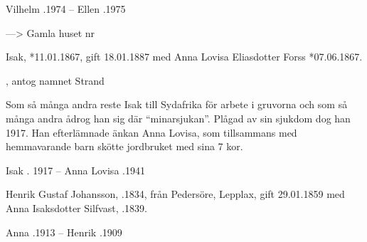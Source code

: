 Vilhelm .1974  --  Ellen .1975



---> Gamla huset nr 


Isak, *11.01.1867, gift 18.01.1887 med Anna Lovisa Eliasdotter Forss *07.06.1867.
\begin{jhchildren}
  \item {}
  \item {}, antog namnet Strand
  \item {}
  \item {}
  \item {}
  \item {}
  \item {}
  \item {}
  \item {}
\end{jhchildren}

Som så många andra reste Isak till Sydafrika för arbete i gruvorna och som så många andra ådrog han sig där ``minarsjukan''. Plågad av sin sjukdom dog han 1917. Han efterlämnade änkan Anna Lovisa, som tillsammans med hemmavarande barn skötte jordbruket med sina 7 kor.

Isak . 1917  --  Anna Lovisa .1941


Henrik Gustaf Johansson, .1834, från Pedersöre, Lepplax, gift 29.01.1859 med Anna Isaksdotter Silfvast, .1839.
\begin{jhchildren}
  \item {}
  \item {}
  \item {}
  \item {}
\end{jhchildren}

Anna .1913  --  Henrik .1909

